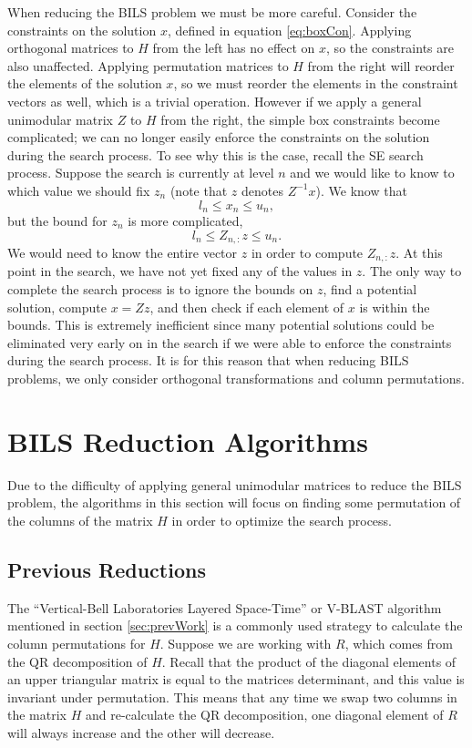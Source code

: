 \documentclass[12pt,Bold,letterpaper]{mcgilletdclass}
\newcommand{\vsp}{\vspace{\baselineskip}}
\begin{document}
When reducing the BILS problem we must be more careful. Consider the constraints on the solution $x$, defined in equation \eqref{eq:boxCon}. Applying orthogonal matrices to $H$ from the left has no effect on $x$, so the constraints are also unaffected. Applying permutation matrices to $H$ from the right will reorder the elements of the solution $x$, so we must reorder the elements in the constraint vectors as well, which is a trivial operation. However if we apply a general unimodular matrix $Z$ to $H$ from the right, the simple box constraints become complicated; we can no longer easily enforce the constraints on the solution during the search process. To see why this is the case, recall the SE search process. Suppose the search is currently at level $n$ and we would like to know to which value we should fix $z_{n}$ (note that $z$ denotes $Z^{-1}x$). We know that $$l_{n} \le x_{n} \le u_{n},$$ but the bound for $z_{n}$ is more complicated, $$l_{n} \le Z_{n,:}z \le u_{n}.$$ We would need to know the entire vector $z$ in order to compute $Z_{n,:}z$. At this point in the search, we have not yet fixed any of the values in $z$. The only way to complete the search process is to ignore the bounds on $z$, find a potential solution, compute $x = Zz$, and then check if each element of $x$ is within the bounds. This is extremely inefficient since many potential solutions could be eliminated very early on in the search if we were able to enforce the constraints during the search process. It is for this reason that when reducing BILS problems, we only consider orthogonal transformations and column permutations.

\vsp \section{BILS Reduction Algorithms} \label{sec:BILSReduction}

Due to the difficulty of applying general unimodular matrices to reduce the BILS problem, the algorithms in this section will focus on finding some permutation of the columns of the matrix $H$ in order to optimize the search process.

\vsp \subsection{Previous Reductions}

The ``Vertical-Bell Laboratories Layered Space-Time'' or V-BLAST algorithm \cite{FosGVW99} mentioned in section \ref{sec:prevWork} is a commonly used strategy to calculate the column permutations for $H$. Suppose we are working with $R$, which comes from the QR decomposition of $H$. Recall that the product of the diagonal elements of an upper triangular matrix is equal to the matrices determinant, and this value is invariant under permutation. This means that any time we swap two columns in the matrix $H$ and re-calculate the QR decomposition, one diagonal element of $R$ will always increase and the other will decrease.
\end{document}
